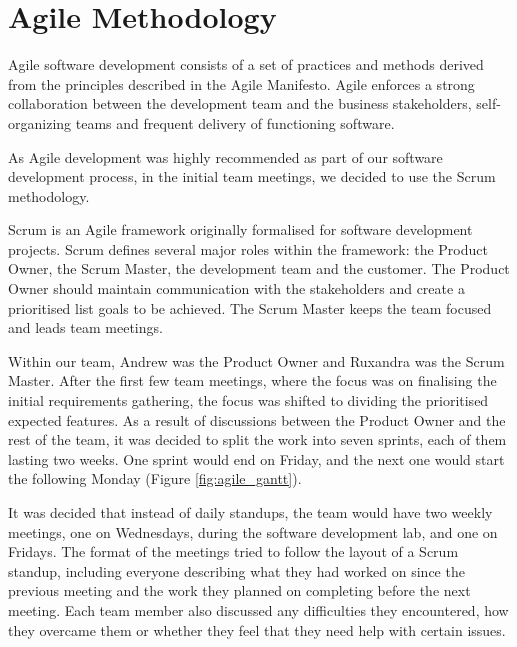 \documentclass{l3proj}
\begin{document}
\section{Agile Methodology} %
\label{sec:agile}


Agile software development consists of a set of practices and methods derived
 from the principles described in the Agile Manifesto. Agile enforces a strong
 collaboration between the development team and the business stakeholders,
 self-organizing teams and frequent delivery of functioning
 software\cite{agile_overview}.

As Agile development was highly recommended as part of our software development
 process, in the initial team meetings, we decided to use the Scrum
 methodology.

 Scrum is an Agile framework originally formalised for software development
 projects. Scrum defines several major roles within the framework: the Product
 Owner, the Scrum Master, the development team and the customer. The Product
 Owner should maintain communication with the stakeholders and create a prioritised
 list goals to be achieved. The Scrum Master keeps the team focused and leads team
 meetings\cite{scrum_overview}.

 Within our team, Andrew was the Product Owner and Ruxandra was the Scrum Master.
  After the first few team meetings, where the focus was on finalising the initial
  requirements gathering, the focus was shifted to dividing the prioritised
  expected features. As a result of discussions between the Product Owner and
  the rest of the team, it was decided to split the work into seven sprints,
  each of them lasting two weeks. One sprint would end on Friday, and the next
  one would start the following Monday (Figure \ref{fig:agile_gantt}).


 It was decided that instead of daily standups, the team would have two weekly
  meetings, one on Wednesdays, during the software development lab, and one on
  Fridays. The format of the meetings tried to follow the layout of a Scrum standup,
  including everyone describing what they had worked on since the previous meeting and 
  the work they planned on completing before the next meeting. Each team member 
  also discussed any difficulties they encountered, how they overcame them or 
  whether they feel that they need help with certain issues.
\end{document}
